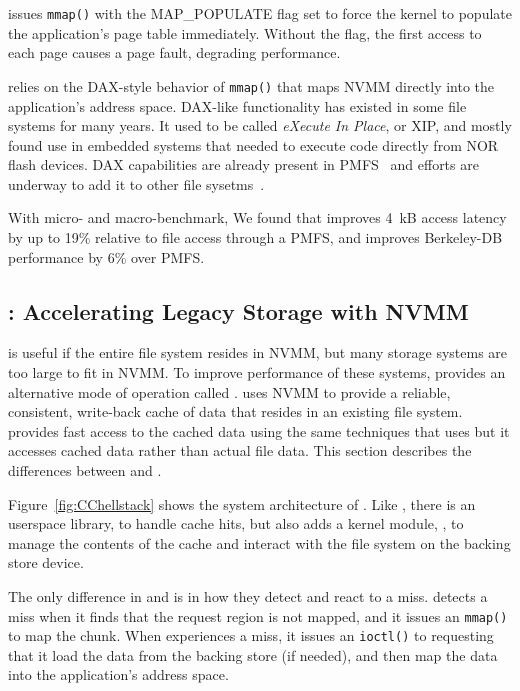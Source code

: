{\DAChell{} issues \texttt{mmap()} with the MAP\_POPULATE flag set to force the kernel to
populate the application's page table immediately.  Without the flag, the first
access to each page causes a page fault, degrading performance.

\DAChell{} relies on the DAX-style behavior of \texttt{mmap()} that maps NVMM
directly into the application's address space.  DAX-like functionality has
existed in some file systems for many years.  It used to be called
\emph{eXecute In Place}, or XIP, and mostly found use in embedded systems that
needed to execute
code directly from NOR flash devices.  DAX capabilities are already present in
PMFS~\cite{PMFS} and efforts are underway to add it to other file sysetms~\cite{ext4dax}.

With micro- and macro-benchmark, We found that \DAChell{} improves 4~kB access
latency by up to 19\% relative to file access through a PMFS, and improves
Berkeley-DB performance by 6\% over PMFS.
}

\subsection{\CChell{}: Accelerating Legacy Storage with NVMM}
\label{sec:overview}

\DAChell{} is useful if the entire file system resides in NVMM, but many
storage systems are too large to fit in NVMM.  To improve
performance of these systems, \Chell{} provides an alternative mode of
operation called \CChell{}.  \CChell{} uses NVMM to provide a reliable,
consistent, write-back cache of data that resides in an existing file system.
\CChell{} provides fast access to the cached data using the same techniques
that \DAChell{} uses but it accesses cached data rather than actual file data.
This section describes the differences between \CChell{}
and \DAChell{}.

Figure~\ref{fig:CChellstack} shows the system architecture of \CChell{}.
Like \DAChell{}, there is an userspace library, \lib{} to handle cache
hits, but \CChell{} also adds a kernel module, \drv{}, to
manage the contents of the cache and interact with the file system on the
backing store device.

The only difference in \libd{} and \lib{} is in
how they detect and react to a miss.  \Libd{} detects a miss when it
finds that the request region is not mapped, and it 
issues an \texttt{mmap()} to map the chunk. When
\Lib{} experiences a miss,
it issues an \texttt{ioctl()} to \drv{} requesting that
it load the data from the backing store (if needed), and then map the data into
the application's address space.

